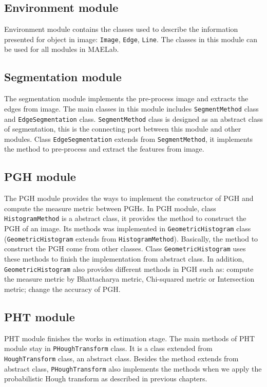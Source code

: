 \subsection*{Environment module}
Environment module contains the classes used to describe the information presented for object in image: \texttt{Image}, \texttt{Edge}, \texttt{Line}. The classes in this module can be used for all modules in MAELab.
\subsection{Segmentation module}
The segmentation module implements the pre-process image and extracts the edges from image. The main classes in this module includes \texttt{SegmentMethod} class and \texttt{EdgeSegmentation} class. \texttt{SegmentMethod} class is designed as an abstract class of segmentation, this is the connecting port between this module and other modules. Class \texttt{EdgeSegmentation} extends from \texttt{SegmentMethod}, it implements the method to pre-process and extract the features from image. 
\subsection{PGH module}
The PGH module provides the ways to implement the constructor of PGH and compute the measure metric between PGHs. In PGH module, class \texttt{HistogramMethod} is a abstract class, it provides the method to construct the PGH of an image. Its methods was implemented in \texttt{GeometricHistogram} class (\texttt{GeometricHistogram} extends from \texttt{HistogramMethod}). Basically, the method to construct the PGH come from other classes. Class \texttt{GeometricHistogram} uses these methods to finish the implementation from abstract class. In addition, \texttt{GeometricHistogram} also provides different methods in PGH such as: compute the measure metric by Bhattacharya metric, Chi-squared metric or Intersection metric; change the accuracy of PGH.
\subsection{PHT module}
PHT module finishes the works in estimation stage. The main methods of PHT module stay in \texttt{PHoughTransform} class. It is a class extended from \texttt{HoughTransform} class, an abstract class. Besides the method extends from abstract class, \texttt{PHoughTransform} also implements the methods when we apply the probabilistic Hough transform as described in previous chapters.
